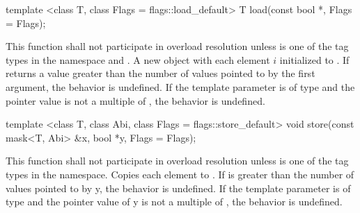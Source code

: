 
\begin{itemdecl}
template <class T, class Flags = flags::load_default> T load(const bool *, Flags = Flags{});
\end{itemdecl}
\begin{itemdescr}
  \pnum\remarks This function shall not participate in overload resolution unless  is one of the tag types in the  namespace and .
  \pnum\returns A new \mask object with each element $i$ initialized to  \foralli.
  \pnum\remarks If  returns a value greater than the number of values pointed to by the first argument, the behavior is undefined.
  \pnum\remarks If the  template parameter is of type  and the pointer value is not a multiple of , the behavior is undefined.
\end{itemdescr}

\begin{itemdecl}
template <class T, class Abi, class Flags = flags::store_default>
void store(const mask<T, Abi> &x, bool *y, Flags = Flags{});
\end{itemdecl}
\begin{itemdescr}
  \pnum\remarks This function shall not participate in overload resolution unless  is one of the tag types in the  namespace.
  \pnum\effects Copies each element  to  \foralli.
  \pnum\remarks If \mask[<T, Abi>] is greater than the number of values pointed to by \code y, the behavior is undefined.
  \pnum\remarks If the  template parameter is of type  and the pointer value of \code y is not a multiple of , the behavior is undefined.
\end{itemdescr}

